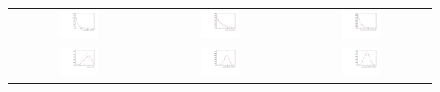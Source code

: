 \begin{figure}
\centering
\begin{tabular}{ccc}
\includegraphics[width=0.3\textwidth]{ANA_resources/Plots/Monte_carlo/data_vs_MC/Kpipipi/acos(Bd_DIRA_OWNPV)_2012.pdf} & \includegraphics[width=0.3\textwidth]{ANA_resources/Plots/Monte_carlo/data_vs_MC/Kpipipi/Bd_IPCHI2_OWNPV_2012.pdf} & \includegraphics[width=0.3\textwidth]{ANA_resources/Plots/Monte_carlo/data_vs_MC/Kpipipi/Bd_LOKI_VFASPF_VCHI2VDOF_2012.pdf} \\
\includegraphics[width=0.3\textwidth]{ANA_resources/Plots/Monte_carlo/data_vs_MC/Kpipipi/Bd_ptasy_1_50_2012.pdf} & \includegraphics[width=0.3\textwidth]{ANA_resources/Plots/Monte_carlo/data_vs_MC/Kpipipi/log10(D0_IPCHI2_OWNPV)_2012.pdf} & \includegraphics[width=0.3\textwidth]{ANA_resources/Plots/Monte_carlo/data_vs_MC/Kpipipi/log10(KstarK_IPCHI2_OWNPV)_2012.pdf} \\

\end{tabular}
\end{figure}
